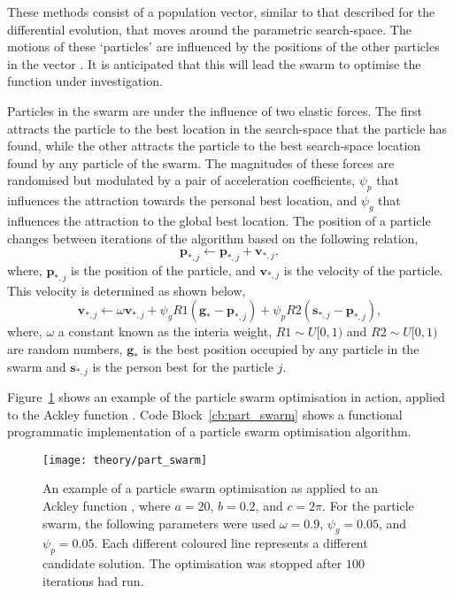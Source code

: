 These methods consist of a population vector, similar to that described for the differential evolution, that moves around the parametric search-space.
The motions of these `particles' are influenced by the positions of the other particles in the vector \cite{poli_analysis_2008}.
It is anticipated that this will lead the swarm to optimise the function under investigation.

Particles in the swarm are under the influence of two elastic forces.
The first attracts the particle to the best location in the search-space that the particle has found, while the other attracts the particle to the best search-space location found by any particle of the swarm.
The magnitudes of these forces are randomised but modulated by a pair of acceleration coefficients, $\psi_p$ that influences the attraction towards the personal best location, and $\psi_g$ that influences the attraction to the global best location.
The position of a particle changes between iterations of the algorithm based on the following relation,
%
\begin{equation}
\mathbf{p}_{*,j} \leftarrow \mathbf{p}_{*,j} + \mathbf{v}_{*,j},
\end{equation}
%
where, $\mathbf{p}_{*,j}$ is the position of the particle, and $\mathbf{v}_{*,j}$ is the velocity of the particle.
This velocity is determined as shown below,
%
\begin{equation}
\mathbf{v}_{*,j} \leftarrow \omega\mathbf{v}_{*,j} + \psi_gR1(\mathbf{g}_{*} - \mathbf{p}_{*,j}) + \psi_pR2(\mathbf{s}_{*,j} - \mathbf{p}_{*,j}),
\end{equation}
%
where, $\omega$ a constant known as the interia weight, $R1\sim U[0, 1)$ and $R2\sim U[0, 1)$ are random numbers, $\mathbf{g}_{*}$ is the best position occupied by any particle in the swarm and $\mathbf{s}_{*,j}$ is the person best for the particle $j$.

Figure~\ref{fig:part_swarm} shows an example of the particle swarm optimisation in action, applied to the Ackley function \cite{ackley_connectionist_1987}. Code Block~\ref{cb:part_swarm} shows a functional programmatic implementation of a particle swarm optimisation algorithm.
%
\begin{figure}
    \centering
    \texttt{[image: theory/part\_swarm]}
    \caption{An example of a particle swarm optimisation as applied to an Ackley function \cite{ackley_connectionist_1987}, where $a=20$, $b=0.2$, and $c=2\pi$. For the particle swarm, the following parameters were used $\omega=0.9$, $\psi_g=0.05$, and $\psi_p=0.05$. Each different coloured line represents a different candidate solution. The optimisation was stopped after $100$ iterations had run.}
    \label{fig:part_swarm}
\end{figure}
%
\begin{figure}
    \centering
        
\end{figure}
%

